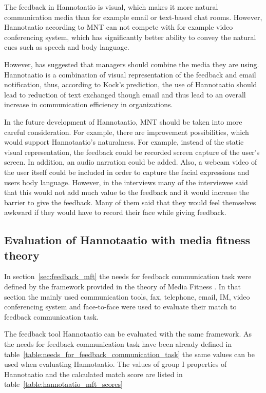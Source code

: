 \documentclass[english,12pt,a4paper,pdftex]{article}
\begin{document}
The feedback in Hannotaatio is visual, which makes it more natural communication media than for example email or text-based chat rooms. However, Hannotaatio according to \ac{MNT} can not compete with for example video conferencing system, which has significantly better ability to convey the natural cues such as speech and body language.

However, \citep{kock2007} has suggested that managers should combine the media they are using. Hannotaatio is a combination of visual representation of the feedback and email notification, thus, according to Kock's prediction, the use of Hannotaatio should lead to reduction of text exchanged though email and thus lead to an overall increase in communication efficiency in organizations.

In the future development of Hannotaatio, \ac{MNT} should be taken into more careful consideration. For example, there are improvement possibilities, which would support Hannotaatio's naturalness. For example, instead of the static visual representation, the feedback could be recorded screen capture of the user's screen. In addition, an audio narration could be added. Also, a webcam video of the user itself could be included in order to capture the facial expressions and users body language. However, in the interviews many of the interviewee said that this would not add much value to the feedback and it would increase the barrier to give the feedback. Many of them said that they would feel themselves awkward if they would have to record their face while giving feedback. 

\subsection{Evaluation of Hannotaatio with media fitness theory}
\label{sec:hannotaatio_mft}

In section~\ref{sec:feedback_mft} the needs for feedback communication task were defined by the framework provided in the theory of Media Fitness \citep{higa2007}. In that section the mainly used communication tools, fax, telephone, email, \ac{IM}, video conferencing system and face-to-face were used to evaluate their match to feedback communication task.

The feedback tool Hannotaatio can be evaluated with the same framework. As the needs for feedback communication task have been already defined in table~\ref{table:needs_for_feedback_communication_task} the same values can be used when evaluating Hannotaatio. The values of group I properties of Hannotaatio and the calculated match score are listed in table~\ref{table:hannotaatio_mft_scores}
\end{document}
